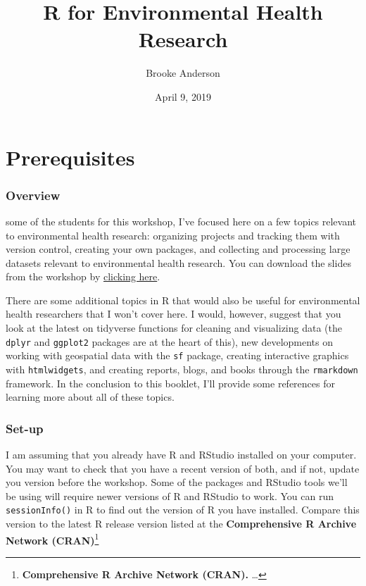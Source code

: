 \documentclass[]{tufte-book}
\title{R for Environmental Health Research}
\author{Brooke Anderson}
\date{April 9, 2019}
\begin{document}
\maketitle



{
\setcounter{tocdepth}{1}
\tableofcontents
}

\hypertarget{prerequisites}{%
\chapter{Prerequisites}\label{prerequisites}}

\hypertarget{overview}{%
\subsection{Overview}\label{overview}}

 some of the students for this
workshop, I've focused here on a few topics relevant to environmental health
research: organizing projects and tracking them with version control, creating
your own packages, and collecting and processing large datasets relevant to
environmental health research. You can download the slides from the workshop by
\href{https://github.com/geanders/columbia_env_health/raw/master/_workshop_slides/workshop_slides.pdf}{clicking
here}.

There are some additional topics in R that would also be useful for
environmental health researchers that I won't cover here. I would, however,
suggest that you look at the latest on tidyverse functions for cleaning and
visualizing data (the \texttt{dplyr} and \texttt{ggplot2} packages are at the heart of this),
new developments on working with geospatial data with the \texttt{sf} package, creating
interactive graphics with \texttt{htmlwidgets}, and creating reports, blogs, and books
through the \texttt{rmarkdown} framework. In the conclusion to this booklet, I'll
provide some references for learning more about all of these topics.

\hypertarget{set-up}{%
\subsection{Set-up}\label{set-up}}

I am assuming that you already have R and RStudio installed on your computer.
You may want to check that you have a recent version of both, and if not, update
you version before the workshop. Some of the packages and RStudio tools we'll be
using will require newer versions of R and RStudio to work. You can run
\texttt{sessionInfo()} in R to find out the version of R you have installed. Compare
this version to the latest R release version listed at the \textbf{Comprehensive R
Archive Network (CRAN)}\footnote{\textbf{Comprehensive R Archive Network (CRAN).} \ldots{}}
\end{document}
